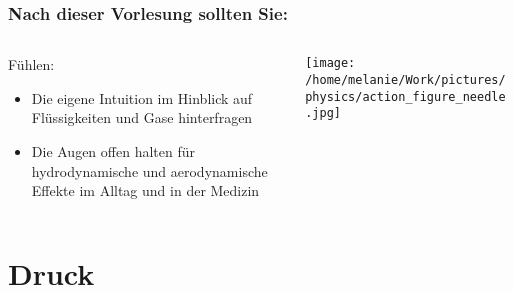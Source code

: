 \documentclass{beamer}
\begin{document}
\begin{frame}

\frametitle{Nach dieser Vorlesung sollten Sie:}
 

 


\begin{columns}[c]

\begin{column}{7cm}
\begin{block}{Fühlen:}

\begin{itemize}
\item
Die eigene Intuition im Hinblick auf Flüssigkeiten und Gase hinterfragen
\item
Die Augen offen halten für hydrodynamische und aerodynamische Effekte im Alltag und in der Medizin
\end{itemize}

\end{block}

\end{column}

\begin{column}{4cm}
\begin{center}
\texttt{[image: /home/melanie/Work/pictures/physics/action\_figure\_needle.jpg]}
\end{center}

\end{column}
\end{columns}



 \end{frame}


\section{Druck}





\begin{frame}
\end{frame}
\end{document}

